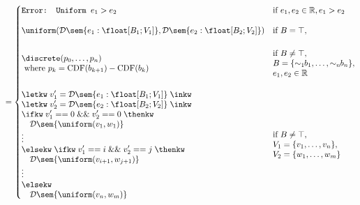 \begin{figure}[t]
    \begin{align}
        =
        \begin{cases}
            \texttt{Error: Uniform $e_1 > e_2$} 
            & \text{if } e_1, e_2 \in \mathbb{R}, e_1 > e_2 \\[1em]
            \uniform(\mathcal{D}\sem{e_1 : \float[B_1;V_1]}, \mathcal{D}\sem{e_2 : \float[B_2;V_2]}) 
            & \text{if } B = \top, \\[1.5em]
            \begin{aligned}
                &\discrete(p_0, \ldots, p_n) \\
                &\text{ where } p_k = \text{CDF}(b_{k+1}) - \text{CDF}(b_k)
            \end{aligned}
            & 
            \begin{aligned}
                &\text{if } B \neq \top, \\
                &B = \{\sim_1\!\!b_1, \ldots, \sim_n\!\!b_n\},\\
                &e_1, e_2 \in \mathbb{R}
            \end{aligned} \\[2.5em]
            \begin{aligned}
                &\letkw \; v_1' = \mathcal{D}\sem{e_1 : \float[B_1; V_1]} \; \inkw \\
                &\letkw \; v_2' = \mathcal{D}\sem{e_2 : \float[B_2; V_2]} \; \inkw \\
                &\ifkw\; v_1' == 0\; \&\& \; v_2' == 0\; \thenkw \\
                &\quad \mathcal{D}\sem{\uniform(v_1, w_1)} \\
                &\vdots \\
                &\elsekw\; \ifkw\; v_1' == i\; \&\& \; v_2' == j\; \thenkw \\
                &\quad \mathcal{D}\sem{\uniform(v_{i+1}, w_{j+1})} \\
                &\vdots \\
                &\elsekw \\
                &\quad \mathcal{D}\sem{\uniform(v_n, w_m)}
            \end{aligned}
            &
            \begin{aligned}
                &\text{if } B \neq \top, \\
                &V_1 = \{v_1, \ldots, v_n\}, \\
                &V_2 = \{w_1, \ldots, w_m\}
            \end{aligned}
        \end{cases}
    \end{align}


\end{figure}
